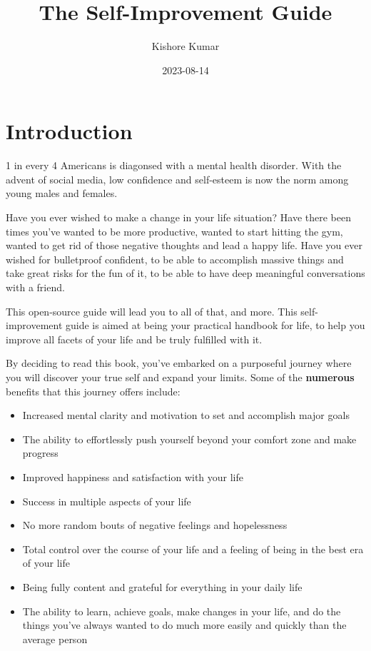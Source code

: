 \documentclass[
]{book}
\title{The Self-Improvement Guide}
\author{Kishore Kumar}
\date{2023-08-14}
\providecommand{\tightlist}{%
  \setlength{\itemsep}{0pt}\setlength{\parskip}{0pt}}
\begin{document}
\maketitle

{
\setcounter{tocdepth}{1}
\tableofcontents
}
\hypertarget{introduction}{%
\chapter{Introduction}\label{introduction}}

1 in every 4 Americans is diagonsed with a mental health disorder. With the advent of social media, low confidence and self-esteem is now the norm among young males and females.

Have you ever wished to make a change in your life situation? Have there been times you've wanted to be more productive, wanted to start hitting the gym, wanted to get rid of those negative thoughts and lead a happy life. Have you ever wished for bulletproof confident, to be able to accomplish massive things and take great risks for the fun of it, to be able to have deep meaningful conversations with a friend.

This open-source guide will lead you to all of that, and more. This self-improvement guide is aimed at being your practical handbook for life, to help you improve all facets of your life and be truly fulfilled with it.

By deciding to read this book, you've embarked on a purposeful journey where you will discover your true self and expand your limits. Some of the \textbf{numerous} benefits that this journey offers include:

\begin{itemize}
\tightlist
\item
  Increased mental clarity and motivation to set and accomplish major goals
\item
  The ability to effortlessly push yourself beyond your comfort zone and make progress
\item
  Improved happiness and satisfaction with your life
\item
  Success in multiple aspects of your life
\item
  No more random bouts of negative feelings and hopelessness
\item
  Total control over the course of your life and a feeling of being in the best era of your life
\item
  Being fully content and grateful for everything in your daily life
\item
  The ability to learn, achieve goals, make changes in your life, and do the things you've always wanted to do much more easily and quickly than the average person
\end{itemize}
\end{document}
